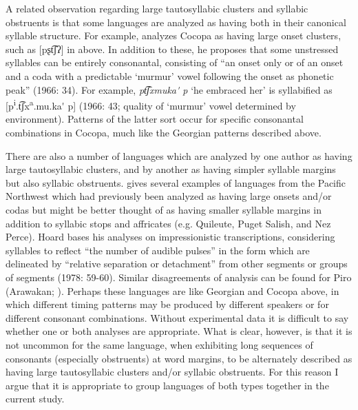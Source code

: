   A related observation regarding large tautosyllabic clusters and syllabic obstruents is that some languages are analyzed as having both in their canonical syllable structure. For example, \citet{Crawford1966} analyzes Cocopa as having large onset clusters, such as [pʂt͡ʃʔ] in  above. In addition to these, he proposes that some unstressed syllables can be entirely consonantal, consisting of “an onset only or of an onset and a coda with a predictable ‘murmur’ vowel following the onset as phonetic peak” (1966: 34). For example, \textit{pt͡ʃxmuka\'{} p} ‘he embraced her’ is syllabified as [p\textsuperscript{i}.t͡ʃx\textsuperscript{a}.mu.ka\'{} p] (1966: 43; quality of ‘murmur’ vowel determined by environment). Patterns of the latter sort occur for specific consonantal combinations in Cocopa, much like the Georgian patterns described above. 

  There are also a number of languages which are analyzed by one author as having large tautosyllabic clusters, and by another as having simpler syllable margins but also syllabic obstruents. \citet{Hoard1978} gives several examples of languages from the Pacific Northwest which had previously been analyzed as having large onsets and/or codas but might be better thought of as having smaller syllable margins in addition to syllabic stops and affricates (e.g. Quileute, Puget Salish, and Nez Perce). Hoard bases his analyses on impressionistic transcriptions, considering syllables to reflect “the number of audible pulses” in the form which are delineated by “relative separation or detachment” from other segments or groups of segments (1978: 59-60). Similar disagreements of analysis can be found for Piro (Arawakan; \citealt{Matteson1965,Lin1997,Hanson2010}). Perhaps these languages are like Georgian and Cocopa above, in which different timing patterns may be produced by different speakers or for different consonant combinations. Without experimental data it is difficult to say whether one or both analyses are appropriate. What is clear, however, is that it is not uncommon for the same language, when exhibiting long sequences of consonants (especially obstruents) at word margins, to be alternately described as having large tautosyllabic clusters and/or syllabic obstruents. For this reason I argue that it is appropriate to group languages of both types together in the current study.

